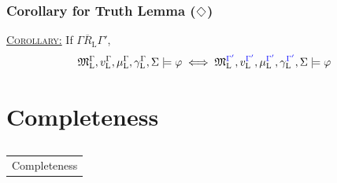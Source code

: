 \documentclass[xcolor=x11names]{beamer}
\makeatletter
\let\beamer@writeslidentry@miniframeson=\beamer@writeslidentry
\def\beamer@writeslidentry@miniframesoff{%
  \expandafter\beamer@ifempty\expandafter{\beamer@framestartpage}{}%
  {%
    \clearpage\beamer@notesactions%
  }
}
\newcommand*{\miniframeson}{\let\beamer@writeslidentry=\beamer@writeslidentry@miniframeson}
\newcommand*{\miniframesoff}{\let\beamer@writeslidentry=\beamer@writeslidentry@miniframesoff}
\newcommand{\cimdia}[1] {\miniframesoff \begin{frame}\begin{center}\huge \begin{tabular}{c}#1\end{tabular}\end{center}\end{frame}\miniframeson}
\newcommand{\szakasz}[2][]{\section{#1}\subsection{}\cimdia{#2}}
\newcommand{\kemph}[1] {{\color{blue}{#1}}}
\renewcommand{\Diamond}{\scalebox{.9}{\raisebox{-.4ex}{\rotatebox{45}{$\Box$}}}}
\makeatother
\begin{document}
\begin{frame}
	\frametitle{Corollary for Truth Lemma ($\Diamond$)}
\footnotesize


\underline{\textsc{Corollary:}} If $\Gamma \overline R_{\mathrm{L}}\Gamma'$,
\[ \mathfrak M_{\mathrm L}^{\Gamma}, v_{\mathrm L}^{\Gamma}, \mu_{\mathrm L}^{\Gamma}, \gamma_{\mathrm L}^{\Gamma}, \Sigma  \models \varphi
   \iff
   \mathfrak M_{\mathrm L}^{\kemph{\Gamma'}}, v_{\mathrm L}^{\kemph{\Gamma'}}, \mu_{\mathrm L}^{\kemph{\Gamma'}}, \gamma_{\mathrm L}^{\kemph{\Gamma'}}, \Sigma  \models \varphi\]
\end{frame}

\szakasz[Completeness]{Completeness}
\end{document}
